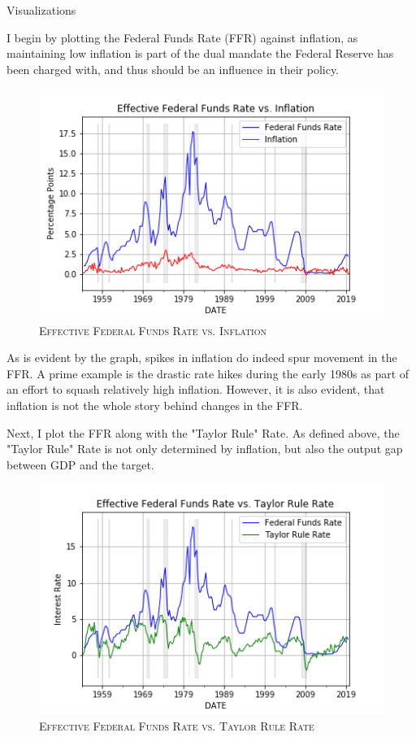 \documentclass[12pt]{article}
\newenvironment{question}[2][Question]{\begin{trivlist}
\item[\hskip \labelsep {\bfseries #1}\hskip \labelsep {\bfseries #2.}]}{\end{trivlist}}
\begin{document}
\begin{question}{3} Visualizations

I begin by plotting the Federal Funds Rate (FFR) against inflation, as maintaining low inflation is part of the dual mandate the Federal Reserve has been charged with, and thus should be an influence in their policy.
\begin{figure}[!h]
\centering
\caption{\textsc{Effective Federal Funds Rate vs. Inflation}}
\includegraphics[scale=0.6]{inflfed_graph.png}
\end{figure}

As is evident by the graph, spikes in inflation do indeed spur movement in the FFR. A prime example is the drastic rate hikes during the early 1980s as part of an effort to squash relatively high inflation. However, it is also evident, that inflation is not the whole story behind changes in the FFR.

Next, I plot the FFR along with the "Taylor Rule" Rate. As defined above, the "Taylor Rule" Rate is not only determined by inflation, but also the output gap between GDP and the target.
\begin{figure}[!h]
\centering
\caption{\textsc{Effective Federal Funds Rate vs. Taylor Rule Rate }}
\includegraphics[scale=0.6]{fed_tr_graph.png}


\end{figure}
\end{question}
\end{document}
